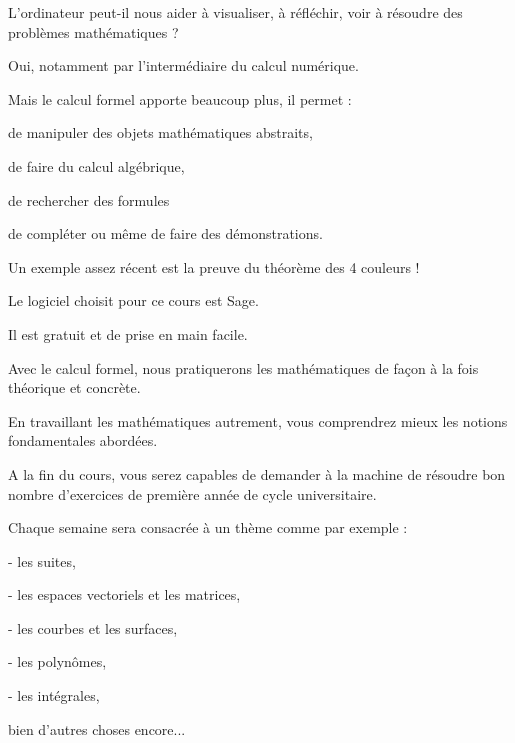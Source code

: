 



\newcommand{\un}[1]{[Arnaud] {\color{blue}{#1}}}
\newcommand{\deux}[1]{[François] {\color{red}{#1}}}
\newcommand{\trois}[1]{[Niels] {\color{orange}{#1}}}




\debuttexte




\diapo


L'ordinateur peut-il nous aider à visualiser, à réfléchir, voir à résoudre des problèmes mathématiques ?

Oui, notamment par l'intermédiaire du calcul numérique.

\change
Mais le calcul formel apporte beaucoup plus, il permet : 

de manipuler des objets mathématiques abstraits, 

de faire du calcul algébrique, 

de rechercher des formules 

de compléter ou même de faire des démonstrations.

Un exemple assez récent est la preuve du théorème des 4 couleurs !

\change
Le logiciel choisit pour ce cours est Sage.

Il est gratuit et de prise en main facile.

Avec le calcul formel, nous pratiquerons les mathématiques de façon à la fois théorique et concrète.

En travaillant les mathématiques autrement, vous comprendrez mieux les notions fondamentales abordées.

A la fin du cours, vous serez capables de demander à la machine de résoudre bon nombre d'exercices de première année de cycle universitaire.

Chaque semaine sera consacrée à un thème comme par exemple :

\change
- les suites,

\change
- les espaces vectoriels et les matrices,

\change
- les courbes et les surfaces,

\change
- les polynômes,

\change
- les intégrales,

bien d'autres choses encore...

